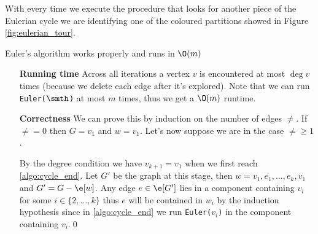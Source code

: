 With every time we execute the procedure that looks for another piece of the Eulerian cycle we are identifying one of the coloured partitions showed in Figure \ref{fig:eulerian_tour}.
\begin{customtheorem}{1.29}
\label{theorem:1.29}
    Euler's algorithm works properly and runs in $\O(m)$
\end{customtheorem}
\begin{prf}
    \begin{itemize}
        To prove the theorem we will consider Runtime and Correctness as two different concepts.
        \item [\textbf{Running time}] Across all iterations a vertex $v$ is encountered at most $\deg{v}$ times (because we delete each edge after it's explored). Note that we can run \texttt{Euler($\smth$)} at most $m$ times, thus we get a $\O(m)$ runtime.
        \item [\textbf{Correctness}] We can prove this by induction on the number of edges $\ne$. If $\ne = 0$ then $G = v_1$ and $w = v_1$. Let's now suppose we are in the case $\ne \geq 1$.
        
        By the degree condition we have $v_{k + 1} = v_1$ when we first reach \ref{algo:cycle_end}. Let $G'$ be the graph at this stage, then $w = v_1, e_1, \dots, e_k, v_1$ and $G' = G - \e[w]$. Any edge $e \in \e[G']$ lies in a component containing $v_i$ for some $i \in \{2, \dots, k\}$ thus $e$ will be contained in $w_i$ by the induction hypothesis since in \ref{algo:cycle_end} we run \texttt{Euler($v_i$)} in the component containing $v_i$.\qed
    \end{itemize}
\end{prf}